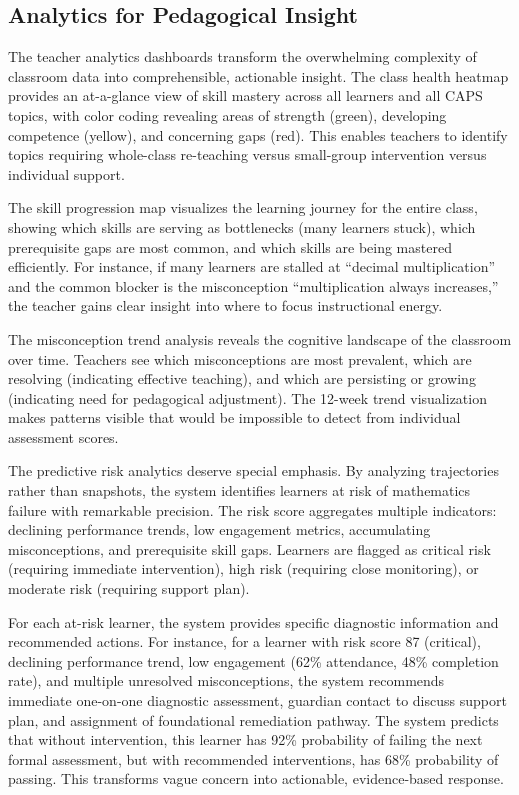 \documentclass[12pt,a4paper]{article}
\begin{document}
\subsection{Analytics for Pedagogical Insight}

The teacher analytics dashboards transform the overwhelming complexity of classroom data into comprehensible, actionable insight. The class health heatmap provides an at-a-glance view of skill mastery across all learners and all CAPS topics, with color coding revealing areas of strength (green), developing competence (yellow), and concerning gaps (red). This enables teachers to identify topics requiring whole-class re-teaching versus small-group intervention versus individual support.

The skill progression map visualizes the learning journey for the entire class, showing which skills are serving as bottlenecks (many learners stuck), which prerequisite gaps are most common, and which skills are being mastered efficiently. For instance, if many learners are stalled at ``decimal multiplication'' and the common blocker is the misconception ``multiplication always increases,'' the teacher gains clear insight into where to focus instructional energy.

The misconception trend analysis reveals the cognitive landscape of the classroom over time. Teachers see which misconceptions are most prevalent, which are resolving (indicating effective teaching), and which are persisting or growing (indicating need for pedagogical adjustment). The 12-week trend visualization makes patterns visible that would be impossible to detect from individual assessment scores.

The predictive risk analytics deserve special emphasis. By analyzing trajectories rather than snapshots, the system identifies learners at risk of mathematics failure with remarkable precision. The risk score aggregates multiple indicators: declining performance trends, low engagement metrics, accumulating misconceptions, and prerequisite skill gaps. Learners are flagged as critical risk (requiring immediate intervention), high risk (requiring close monitoring), or moderate risk (requiring support plan).

For each at-risk learner, the system provides specific diagnostic information and recommended actions. For instance, for a learner with risk score 87 (critical), declining performance trend, low engagement (62\% attendance, 48\% completion rate), and multiple unresolved misconceptions, the system recommends immediate one-on-one diagnostic assessment, guardian contact to discuss support plan, and assignment of foundational remediation pathway. The system predicts that without intervention, this learner has 92\% probability of failing the next formal assessment, but with recommended interventions, has 68\% probability of passing. This transforms vague concern into actionable, evidence-based response.
\end{document}
